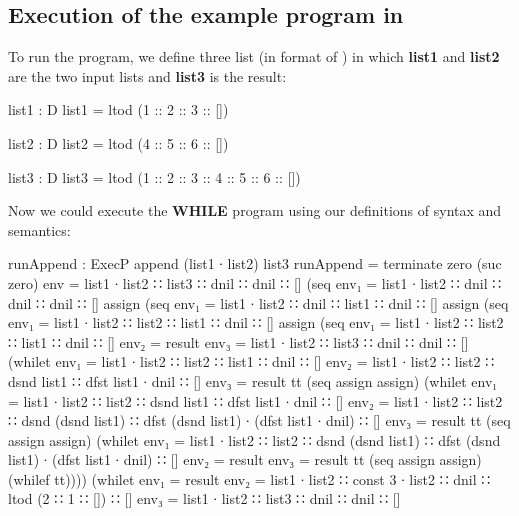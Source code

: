 \subsection{Execution of the example \WHILE program in \Agda}
To run the program, we define three list (in format of ) in which \textbf{list1} and \textbf{list2} are the two input lists and \textbf{list3} is the result:
\begin{code}
list1 : D
list1 = ltod (1 :: 2 :: 3 :: [])

list2 : D
list2 = ltod (4 :: 5 :: 6 :: [])

list3 : D
list3 = ltod (1 :: 2 :: 3 :: 4 :: 5 :: 6 :: [])
\end{code}
Now we could execute the \textbf{WHILE} program using our definitions of syntax and semantics:
\begin{code}[fontsize=\footnotesize]
runAppend : ExecP append (list1 ∙ list2) list3
runAppend = terminate zero (suc zero)
                 {env = list1 ∙ list2 ∷ list3 ∷ dnil ∷ dnil ∷ []}
            (seq {env₁ = list1 ∙ list2 ∷ dnil ∷ dnil ∷ dnil ∷ []}
             assign
            (seq {env₁ = list1 ∙ list2 ∷ dnil ∷ list1 ∷ dnil ∷ []}
             assign
            (seq {env₁ = list1 ∙ list2 ∷ list2 ∷ list1 ∷ dnil ∷ []}
             assign
            (seq {env₁ = list1 ∙ list2 ∷ list2 ∷ list1 ∷ dnil ∷ []}
                 {env₂ = result}
                 {env₃ =  list1 ∙ list2 ∷ list3 ∷ dnil ∷ dnil ∷ []}
            (whilet {env₁ = list1 ∙ list2 ∷ list2 ∷ list1 ∷ dnil ∷ []}
                    {env₂ = list1 ∙ list2 ∷ list2 ∷
                            dsnd list1 ∷ dfst list1 ∙ dnil ∷ []}
                    {env₃ = result}
             tt 
            (seq assign assign)
            (whilet {env₁ = list1 ∙ list2 ∷ list2 ∷
                            dsnd list1 ∷ dfst list1 ∙ dnil ∷ []}
                    {env₂ = list1 ∙ list2 ∷ list2 ∷ dsnd (dsnd list1) ∷
                            dfst (dsnd list1) ∙ (dfst list1 ∙ dnil) ∷ []}
                    {env₃ = result}
             tt
            (seq assign assign)
            (whilet {env₁ = list1 ∙ list2 ∷ list2 ∷ dsnd (dsnd list1) ∷
                            dfst (dsnd list1) ∙ (dfst list1 ∙ dnil) ∷ []}
                    {env₂ = result}
                    {env₃ = result}
             tt
            (seq assign assign)
            (whilef tt))))
            (whilet {env₁ = result}
                    {env₂ = list1 ∙ list2 ∷ const 3 ∙ list2 ∷
                            dnil ∷ ltod (2 ∷ 1 ∷ []) ∷ []}
                    {env₃ = list1 ∙ list2 ∷ list3 ∷ dnil ∷ dnil ∷ []}

\end{code}
